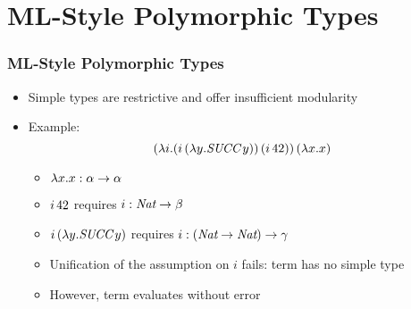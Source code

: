\documentclass[pdftex,aspectratio=169]{beamer}
\subtitle
{Polymorphic Types}
\begin{document}
\begin{frame}
  \titlepage
\end{frame}



\section{ML-Style Polymorphic Types}
\begin{frame}
  \frametitle{ML-Style Polymorphic Types}
  \begin{itemize}
  \item Simple types are restrictive and offer insufficient modularity
  \item Example: 
    \begin{displaymath}
      (\lambda i. (i\, (\lambda y.\textit{SUCC}\, y))\, (i\,42))\, (\lambda x.x)
    \end{displaymath}
    \begin{itemize}
    \item $\lambda x.x : \alpha\to\alpha$
    \item $i\,42$ requires $i : \textit{Nat} \to \beta$
    \item $i\, (\lambda y.\textit{SUCC}\, y)$ requires $i : (\textit{Nat}\to\textit{Nat}) \to \gamma$
    \item Unification of the assumption on $i$ fails: term has no
      simple type
    \item However, term evaluates without error
    \end{itemize}
  \end{itemize}
\end{frame}
\end{document}
